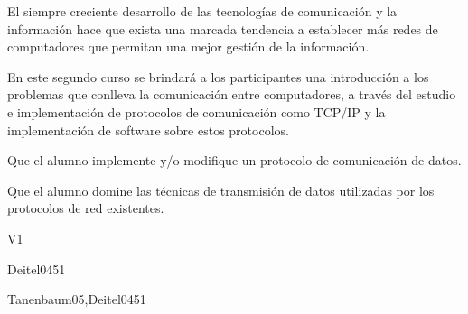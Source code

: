 \begin{syllabus}


\begin{justification}
        El siempre creciente desarrollo de las tecnologías de comunicación y la
        información hace que exista una marcada tendencia a  establecer
        más redes de computadores que permitan una mejor
        gestión de la información.
        
        En este segundo curso se brindará a los participantes una introducción a los
        problemas que conlleva la comunicación entre computadores, a través del
        estudio e implementación de protocolos de comunicación como TCP/IP y
        la implementación de software sobre estos protocolos.
        \end{justification}
        
        \begin{goals}
        \item Que el alumno implemente y/o modifique un protocolo de comunicación de datos.
        \item Que el alumno domine las técnicas de transmisión de datos utilizadas por los protocolos de red existentes.
        \end{goals}
        
        \begin{outcomes}{V1}
                \item {}
                \item {}
                \item {}
                \item {}
                \item {}
                \item {}
        \end{outcomes}
        
        \begin{unit}{\PLEventDrivenandReactiveProgramming}{}{Deitel04}{5}{1}
                \PLEventDrivenandReactiveProgrammingAllTopics
                \PLEventDrivenandReactiveProgrammingAllLearningOutcomes
        \end{unit}
        
        \begin{unit}{\IASNetworkSecurity}{}{Tanenbaum05,Deitel04}{5}{1}
                \IASNetworkSecurityAllTopics
                \IASNetworkSecurityAllLearningOutcomes
        \end{unit}
        

\end{syllabus}
